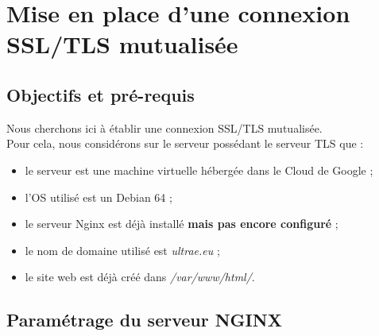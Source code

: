 \section{Mise en place d'une connexion SSL/TLS mutualisée}

\subsection{Objectifs et pré-requis}

Nous cherchons ici à établir une connexion SSL/TLS mutualisée. \\

Pour cela, nous considérons sur le serveur possédant le serveur TLS que :
\begin{itemize}
    \item le serveur est une machine virtuelle hébergée dans le Cloud de Google ;
    \item l'OS utilisé est un Debian 64 ;
    \item le serveur Nginx est déjà installé \textbf{mais pas encore configuré} ;
    \item le nom de domaine utilisé est \textit{ultrae.eu} ;
    \item le site web est déjà créé dans \textit{/var/www/html/}.
\end{itemize}

\subsection{Paramétrage du serveur NGINX}

